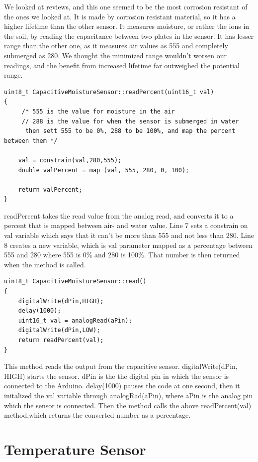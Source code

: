 \documentclass[a4paper,12pt,twoside,openright,titlepage]{book}
\begin{document}
We looked at reviews, and this one seemed to be the most corrosion resistant of the ones we looked at. It is made by corrosion resistant material, so it has a higher lifetime than the other sensor. It measures moisture, or rather the ions in the soil, by reading the capacitance between two plates in the sensor. It has lesser range than the other one, as it measures air values as 555 and completely submerged as 280. We thought the minimized range wouldn't worsen our readings, and the benefit from increased lifetime far outweighed the potential range.

\begin{lstlisting}[language=Arduino]
uint8_t CapacitiveMoistureSensor::readPercent(uint16_t val)
{
     /* 555 is the value for moisture in the air
	 // 288 is the value for when the sensor is submerged in water
	  then sett 555 to be 0%, 288 to be 100%, and map the percent between them */
	
	val = constrain(val,280,555);
	double valPercent = map (val, 555, 280, 0, 100);

	return valPercent;
}

\end{lstlisting}
readPercent takes the read value from the analog read, and converts it to a percent that is mapped between air- and water value. Line 7 sets a constrain on val variable which says that it can't be more than 555 and not less than 280. Line 8 creates a new variable, which is val parameter mapped as a percentage between 555 and 280 where 555 is 0\% and 280 is 100\%. That number is then returned when the method is called.

\begin{lstlisting}[language=Arduino]
uint8_t CapacitiveMoistureSensor::read()
{
	digitalWrite(dPin,HIGH);
	delay(1000);
    uint16_t val = analogRead(aPin);
	digitalWrite(dPin,LOW);
    return readPercent(val);
}
\end{lstlisting}

This method reads the output from the capacitive sensor. digitalWrite(dPin, HIGH) starts the sensor. dPin is the the digital pin in which the sensor is connected to the Arduino. delay(1000) pauses the code at one second, then it initalized the val variable through analogRad(aPin), where aPin is the analog pin which the sensor is connected. Then the method calls the above readPercent(val) method,which returns the converted number as a percentage.

\section{Temperature Sensor}
\end{document}

